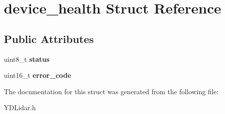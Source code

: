\hypertarget{structdevice__health}{}\section{device\+\_\+health Struct Reference}
\label{structdevice__health}
\subsection*{Public Attributes}
\begin{DoxyCompactItemize}
\item 
uint8\+\_\+t {\bfseries status}\hypertarget{structdevice__health_ac3425f5555ecbb5a0da03b4cabe2777c}{}\label{structdevice__health_ac3425f5555ecbb5a0da03b4cabe2777c}

\item 
uint16\+\_\+t {\bfseries error\+\_\+code}\hypertarget{structdevice__health_a8815828d6de33cb43e8b72da48f51f23}{}\label{structdevice__health_a8815828d6de33cb43e8b72da48f51f23}

\end{DoxyCompactItemize}


The documentation for this struct was generated from the following file\+:\begin{DoxyCompactItemize}
\item 
Y\+D\+Lidar.\+h\end{DoxyCompactItemize}
